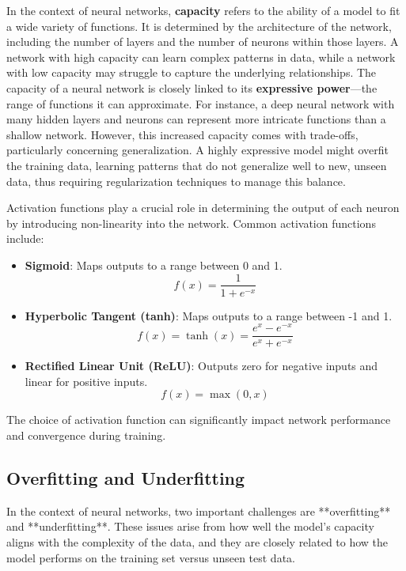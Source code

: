 In the context of neural networks, \textbf{capacity} refers to the ability of a model to fit a wide variety of functions. It is determined by the architecture of the network, including the number of layers and the number of neurons within those layers. A network with high capacity can learn complex patterns in data, while a network with low capacity may struggle to capture the underlying relationships. The capacity of a neural network is closely linked to its \textbf{expressive power}—the range of functions it can approximate. For instance, a deep neural network with many hidden layers and neurons can represent more intricate functions than a shallow network. However, this increased capacity comes with trade-offs, particularly concerning generalization. A highly expressive model might overfit the training data, learning patterns that do not generalize well to new, unseen data, thus requiring regularization techniques to manage this balance.


Activation functions play a crucial role in determining the output of each neuron by introducing non-linearity into the network. Common activation functions include:

\begin{itemize}
    \item \textbf{Sigmoid}: Maps outputs to a range between 0 and 1.
    \[
    f(x) = \frac{1}{1 + e^{-x}}
    \]
    
    \item \textbf{Hyperbolic Tangent (tanh)}: Maps outputs to a range between -1 and 1.
    \[
    f(x) = \tanh(x) = \frac{e^x - e^{-x}}{e^x + e^{-x}}
    \]
    
    \item \textbf{Rectified Linear Unit (ReLU)}: Outputs zero for negative inputs and linear for positive inputs.
    \[
    f(x) = \max(0, x)
    \]
\end{itemize}

The choice of activation function can significantly impact network performance and convergence during training.


\subsection{Overfitting and Underfitting}

In the context of neural networks, two important challenges are **overfitting** and **underfitting**. These issues arise from how well the model's capacity aligns with the complexity of the data, and they are closely related to how the model performs on the training set versus unseen test data.

